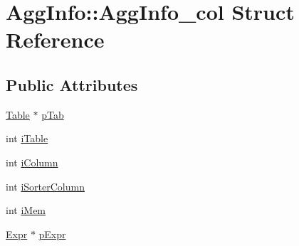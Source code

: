 \hypertarget{struct_agg_info_1_1_agg_info__col}{\section{Agg\-Info\-:\-:Agg\-Info\-\_\-col Struct Reference}
\label{struct_agg_info_1_1_agg_info__col}
}
\subsection*{Public Attributes}
\begin{DoxyCompactItemize}
\item 
\hyperlink{struct_table}{Table} $\ast$ \hyperlink{struct_agg_info_1_1_agg_info__col_ad2f2ae137b49e72d28a57accc9d06386}{p\-Tab}
\item 
int \hyperlink{struct_agg_info_1_1_agg_info__col_ab49aa2fbfc6278c86b64497a6807c113}{i\-Table}
\item 
int \hyperlink{struct_agg_info_1_1_agg_info__col_a4cad2ce99ddf7425d358d49e40524f6b}{i\-Column}
\item 
int \hyperlink{struct_agg_info_1_1_agg_info__col_ae3901ad0d5b6d519a7559358f1f7248b}{i\-Sorter\-Column}
\item 
int \hyperlink{struct_agg_info_1_1_agg_info__col_ae22f3dfc6f9c2dc647be1b9fbd14e896}{i\-Mem}
\item 
\hyperlink{struct_expr}{Expr} $\ast$ \hyperlink{struct_agg_info_1_1_agg_info__col_a60f23ec0abfcc88cab7083967a3abd9e}{p\-Expr}
\end{DoxyCompactItemize}



